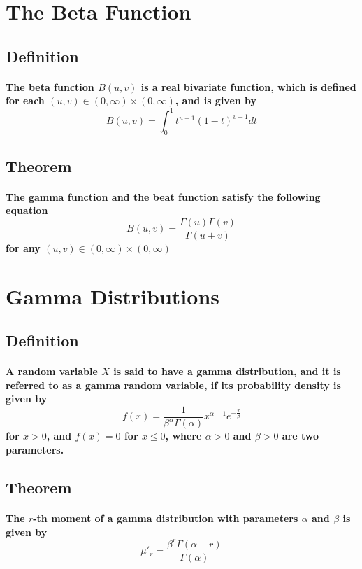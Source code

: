 \documentclass[titlepage]{article}
\begin{document}
    \section{The Beta Function}
        \subsection*{Definition}
            \paragraph{
                The beta function $B(u,v)$ is a real bivariate function, which is defined for each $(u,v)\in (0,\infty)\times(0,\infty)$, and is given by 
                $$B(u,v)=\int_0^1t^{u-1}(1-t)^{v-1}dt$$
            }
        \subsection*{Theorem}
            \paragraph{
                The gamma function and the beat function satisfy the following equation
                $$B(u,v)=\frac{\Gamma(u)\Gamma(v)}{\Gamma(u+v)}$$
                for any $(u,v)\in (0,\infty)\times(0,\infty)$
            }
            
    \section{Gamma Distributions}
        \subsection*{Definition}
            \paragraph{
                A random variable $X$ is said to have a gamma distribution, and it is referred to as a gamma random variable, if its probability density is given by 
                $$f(x)=\frac{1}{\beta^{\alpha}\Gamma(\alpha)}x^{\alpha-1}e^{-\frac{x}{\beta}}$$
                for $x>0$, and $f(x)=0$ for $x\leq 0$, where $\alpha>0$ and $\beta>0$ are two parameters.
            }
        \subsection*{Theorem}
            \paragraph{
                The $r$-th moment of a gamma distribution with parameters $\alpha$ and $\beta$ is given by 
                $$\mu'_r=\frac{\beta^r\Gamma(\alpha+r)}{\Gamma(\alpha)}$$
            }
\end{document}
